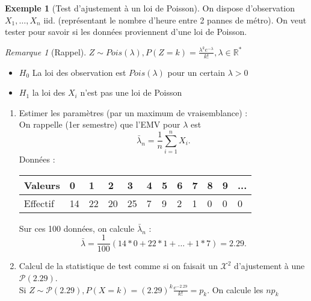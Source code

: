 \documentclass{article}
\theoremstyle{plain}%
\theoremstyle{definition}
\newtheorem{exmp}{Exemple}[section]
\theoremstyle{remark}
\newtheorem*{rem}{Remarque}
\begin{document}
\begin{exmp}[Test d'ajustement à un loi de Poisson]
    On dispose d'observation $ X_1, \dots, X_n $ iid. (représentant le nombre d'heure entre 2 pannes de métro). On veut tester pour savoir si les données proviennent d'une loi de Poisson. \\
    \begin{rem}[Rappel]
        $ Z \sim Pois(\lambda), P(Z=k) = \frac{\lambda^k e^{-\lambda}}{k!}, \lambda \in \mathbb{R}^* $ \begin{itemize}
            \item $ H_0 $ La loi des observation est $ Pois(\lambda ) $ pour un certain $ \lambda > 0 $ 
            \item $ H_1 $ la loi des $ X_i $ n'est pas une loi de Poisson
        \end{itemize}
    \end{rem}
    \begin{enumerate}
        \item Estimer les paramètres (par un maximum de vraisemblance) : \\
            On rappelle (1er semestre) que l'EMV pour $ \lambda  $ est 
            \[
                \bar{\lambda }_n = \frac{1}{n}\sum_{i=1}^{n}X_i
            .\]
            Données : 
            \begin{table}[!h]
                \centering
                \begin{tabular}{|l|l|l|l|l|l|l|l|l|l|l|l|}
                \hline
                    Valeurs & 0 & 1 & 2 & 3 & 4 & 5 & 6 & 7 & 8 & 9 & ... \\ \hline
                    Effectif & 14 & 22 & 20 & 25 & 7 & 9 & 2 & 1 & 0 & 0 & 0 \\ \hline
                \end{tabular}
            \end{table}
            Sur ces 100 données, on calcule $ \bar{\lambda } _n $ : 
            \[
                \bar{\lambda } = \frac{1}{100}(14*0 + 22*1 + \dots + 1*7) = 2.29
            .\]
        \item Calcul de la statistique de test comme si on faisait un $ \mathcal{X}^2 $ d'ajustement à une $ \mathcal{P}(2.29) $. \\
            Si $ Z \sim \mathcal{P}(2.29), P(X=k) = (2.29)^k \frac{e^{-2.29}}{k!} = p_k $. On calcule les $ np_k $ 
            \begin{table}[!h]
                \centering
                \begin{tabular}{|l|l|l|l|l|l|l|l|l|l|}

\end{tabular}
\end{table}
\end{enumerate}
\end{exmp}
\end{document}
